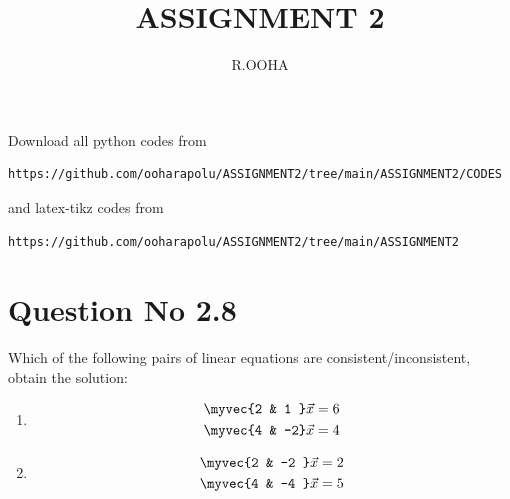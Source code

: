 \documentclass[journal,12pt,twocolumn]{IEEEtran}
\begin{document}
     \def\rightbox#1{\makebox[0in][r]{#1}}
     \def\centbox#1{\makebox[0in]{#1}}
     \def\topbox#1{\raisebox{-\baselineskip}[0in][0in]{#1}}
     \def\midbox#1{\raisebox{-0.5\baselineskip}[0in][0in]{#1}}
\vspace{3cm}
\title{ASSIGNMENT 2}
\author{R.OOHA}
\maketitle
\newpage
\bigskip
\renewcommand{\thefigure}{\theenumi}
\renewcommand{\thetable}{\theenumi}
Download all python codes from 
\begin{lstlisting}
https://github.com/ooharapolu/ASSIGNMENT2/tree/main/ASSIGNMENT2/CODES
\end{lstlisting}
%
and latex-tikz codes from 
%
\begin{lstlisting}
https://github.com/ooharapolu/ASSIGNMENT2/tree/main/ASSIGNMENT2
\end{lstlisting}
%
\section{Question No 2.8}
Which of the following pairs of linear equations are consistent/inconsistent, obtain the solution:
%
\begin{enumerate}
\item
\begin{align}
\begin{split}
\myvec{2 & 1 }\vec{x}&=6
\\
\myvec{4  & -2}\vec{x}&=4 \label{1.0.1}
\end{split}
\end{align}
\item
\begin{align}
\begin{split}
\myvec{2 & -2 }\vec{x}&=2
\\
\myvec{4 & -4 }\vec{x}&=5 \label{1.0.2}
\end{split}
\end{align}
\end{enumerate}
%
\end{document}
